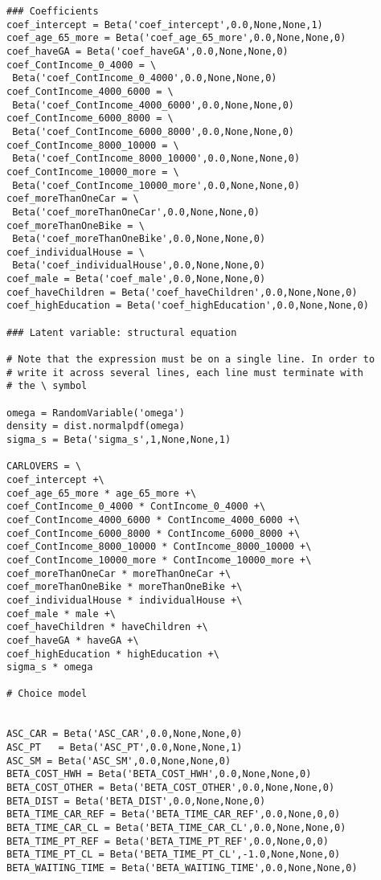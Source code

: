 \documentclass[12pt,a4paper]{article}
\begin{document}
\begin{lstlisting}[style=numbers]
### Coefficients
coef_intercept = Beta('coef_intercept',0.0,None,None,1)
coef_age_65_more = Beta('coef_age_65_more',0.0,None,None,0)
coef_haveGA = Beta('coef_haveGA',0.0,None,None,0)
coef_ContIncome_0_4000 = \
 Beta('coef_ContIncome_0_4000',0.0,None,None,0)
coef_ContIncome_4000_6000 = \
 Beta('coef_ContIncome_4000_6000',0.0,None,None,0)
coef_ContIncome_6000_8000 = \
 Beta('coef_ContIncome_6000_8000',0.0,None,None,0)
coef_ContIncome_8000_10000 = \
 Beta('coef_ContIncome_8000_10000',0.0,None,None,0)
coef_ContIncome_10000_more = \
 Beta('coef_ContIncome_10000_more',0.0,None,None,0)
coef_moreThanOneCar = \
 Beta('coef_moreThanOneCar',0.0,None,None,0)
coef_moreThanOneBike = \
 Beta('coef_moreThanOneBike',0.0,None,None,0)
coef_individualHouse = \
 Beta('coef_individualHouse',0.0,None,None,0)
coef_male = Beta('coef_male',0.0,None,None,0)
coef_haveChildren = Beta('coef_haveChildren',0.0,None,None,0)
coef_highEducation = Beta('coef_highEducation',0.0,None,None,0)

### Latent variable: structural equation

# Note that the expression must be on a single line. In order to 
# write it across several lines, each line must terminate with 
# the \ symbol

omega = RandomVariable('omega')
density = dist.normalpdf(omega) 
sigma_s = Beta('sigma_s',1,None,None,1)

CARLOVERS = \
coef_intercept +\
coef_age_65_more * age_65_more +\
coef_ContIncome_0_4000 * ContIncome_0_4000 +\
coef_ContIncome_4000_6000 * ContIncome_4000_6000 +\
coef_ContIncome_6000_8000 * ContIncome_6000_8000 +\
coef_ContIncome_8000_10000 * ContIncome_8000_10000 +\
coef_ContIncome_10000_more * ContIncome_10000_more +\
coef_moreThanOneCar * moreThanOneCar +\
coef_moreThanOneBike * moreThanOneBike +\
coef_individualHouse * individualHouse +\
coef_male * male +\
coef_haveChildren * haveChildren +\
coef_haveGA * haveGA +\
coef_highEducation * highEducation +\
sigma_s * omega

# Choice model


ASC_CAR = Beta('ASC_CAR',0.0,None,None,0)
ASC_PT	 = Beta('ASC_PT',0.0,None,None,1)
ASC_SM = Beta('ASC_SM',0.0,None,None,0)
BETA_COST_HWH = Beta('BETA_COST_HWH',0.0,None,None,0)
BETA_COST_OTHER = Beta('BETA_COST_OTHER',0.0,None,None,0)
BETA_DIST = Beta('BETA_DIST',0.0,None,None,0)
BETA_TIME_CAR_REF = Beta('BETA_TIME_CAR_REF',0.0,None,0,0)
BETA_TIME_CAR_CL = Beta('BETA_TIME_CAR_CL',0.0,None,None,0)
BETA_TIME_PT_REF = Beta('BETA_TIME_PT_REF',0.0,None,0,0)
BETA_TIME_PT_CL = Beta('BETA_TIME_PT_CL',-1.0,None,None,0)
BETA_WAITING_TIME = Beta('BETA_WAITING_TIME',0.0,None,None,0)


\end{lstlisting}
\end{document}
